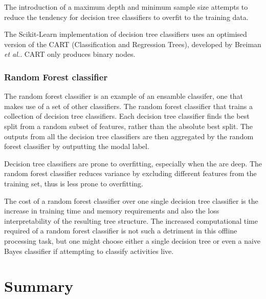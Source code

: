         The introduction of a maximum depth and minimum sample size attempts to reduce the tendency for decision tree classifiers to overfit to the training data.
      
        The Scikit-Learn implementation of decision tree classifiers uses an optimised version of the CART (Classification and Regression Trees), developed by Breiman \emph{et al.}\cite{breiman1984classification}. CART only produces binary nodes. 
      
      \subsubsection{Random Forest classifier}
        The random forest classifier is an example of an ensamble classifer, one that makes use of a set of other classifiers. The random forest classifier that trains a collection of decision tree classifiers. Each decision tree classifier finds the best split from a random subset of features, rather than the absolute best split. The outputs from all the decision tree classifiers are then aggregated by the random forest classifier by outputting the modal label.
        
        Decision tree classifiers are prone to overfitting, especially when the are deep. The random forest classifier reduces variance by excluding different features from the training set, thus is less prone to overfitting.
        
        The cost of a random forest classifier over one single decision tree classifier is the increase in training time and memory requirements and also the loss interpretability of the resulting tree structure. The increased computational time required of a random forest classifier is not such a detriment in this offline processing task, but one might choose either a single decision tree or even a naive Bayes classifier if attempting to classify activities live.
  \section{Summary}
